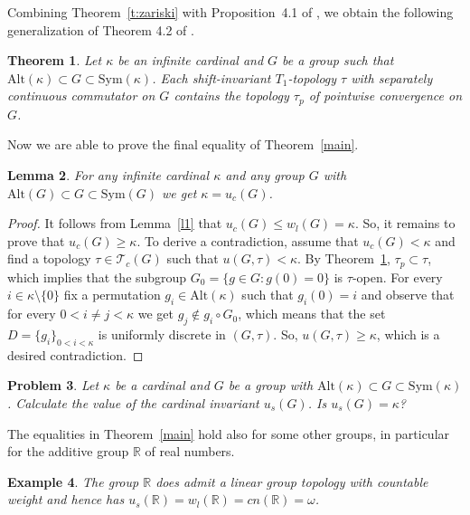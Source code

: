 \documentclass[11pt, twoside]{amsart}
\newtheorem{theorem}{Theorem}
\newtheorem{lemma}[theorem]{Lemma}
\newtheorem{problem}[theorem]{Problem}
\newtheorem{example}[theorem]{Example}
\theoremstyle{definition}
\begin{document}
Combining Theorem~\ref{t:zariski} with Proposition~4.1 of \cite{BGP}, we obtain the following generalization of Theorem 4.2 of \cite{BGP}.

\begin{theorem}\label{t:tp} Let $\kappa$ be an infinite cardinal and $G$ be a group such that ${\mathrm{Alt}}(\kappa)\subset G\subset{\mathrm{Sym}}(\kappa)$. Each shift-invariant $T_1$-topology $\tau$ with separately continuous commutator on $G$ contains the topology $\tau_p$ of pointwise convergence on $G$.
\end{theorem}

Now we are able to prove the final equality of Theorem~\ref{main}.

\begin{lemma}\label{l3} For any infinite cardinal $\kappa$ and any group $G$ with ${\mathrm{Alt}}(G)\subset G\subset{\mathrm{Sym}}(G)$ we get $\kappa=u_c(G)$.
\end{lemma}

\begin{proof} It follows from Lemma~\ref{l1} that $u_c(G)\le w_l(G)=\kappa$. So, it remains to prove that $u_c(G)\ge \kappa$. To derive a contradiction, assume that $u_c(G)<\kappa$ and find a  topology $\tau\in{\mathcal T}_c(G)$ such that $u(G,\tau)<\kappa$. By Theorem~\ref{t:tp}, $\tau_p\subset \tau$, which implies that the subgroup $G_0=\{g\in G:g(0)=0\}$ is $\tau$-open. For every $i\in\kappa\setminus \{0\}$ fix a permutation $g_i\in{\mathrm{Alt}}(\kappa)$ such that $g_i(0)=i$ and observe that for every $0<i\ne j<\kappa$ we get $g_j\notin g_i\circ G_0$, which means that the set $D=\{g_i\}_{0<i<\kappa}$ is uniformly discrete in $(G,\tau)$. So, $u(G,\tau)\ge \kappa$, which is a desired contradiction.
\end{proof}

\begin{problem} Let $\kappa$ be a cardinal and $G$ be a group with ${\mathrm{Alt}}(\kappa)\subset G\subset{\mathrm{Sym}}(\kappa)$. Calculate the value of the cardinal invariant $u_s(G)$. Is $u_s(G)=\kappa$?
\end{problem}

The equalities in Theorem~\ref{main} hold also for some other groups, in particular for the additive group ${\mathbb R}$ of real numbers.

\begin{example} The group ${\mathbb R}$ does admit a linear group topology with countable weight and hence has $u_s({\mathbb R})=w_l({\mathbb R})={cn}({\mathbb R})={\omega}$.
\end{example}
\end{document}
